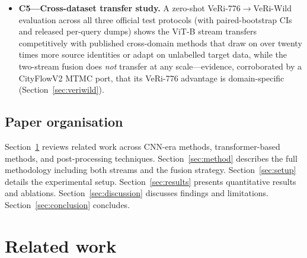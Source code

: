 \documentclass[10pt,a4paper]{article}
\begin{document}
\begin{itemize}
{    analysis.} All checkpoints (SHA-256 pinned), evaluation notebooks,
    configuration files, per-query evaluation dumps, and the post-processing
    pipeline are publicly released. Every reported number is the deterministic
    re-evaluation of a frozen, hash-pinned checkpoint and is thus
    \emph{exactly} re-computable from the release; from-scratch retraining is
    reproducible within a $\pm0.55$\,pp seed band
    (Section~\ref{sec:seed_variance}). Headline numbers use hyperparameters
    selected on the standard evaluation split---disclosed, not implicit---with
    held-out validation bounding the resulting optimism to $\leq$0.2\,pp mAP
    (Section~\ref{sec:holdout}), and the latency and memory of every pipeline
    stage---extraction, TTA, AQE, re-ranking, fusion---are measured for
    deployment planning (Section~\ref{sec:cost}).
  \item \textbf{C5---Cross-dataset transfer study.} A zero-shot
    VeRi-776$\rightarrow$VeRi-Wild evaluation across all three official test
    protocols (with paired-bootstrap CIs and released per-query dumps) shows
    the ViT-B stream transfers competitively with published cross-domain
    methods that draw on over twenty times more source identities or adapt on
    unlabelled target data, while the two-stream fusion does \emph{not}
    transfer at any scale---evidence, corroborated by a CityFlowV2 MTMC port,
    that its VeRi-776 advantage is domain-specific
    (Section~\ref{sec:veriwild}).
\end{itemize}

\subsection{Paper organisation}
Section~\ref{sec:related} reviews related work across CNN-era methods,
transformer-based methods, and post-processing techniques.
Section~\ref{sec:method} describes the full methodology including both streams
and the fusion strategy. Section~\ref{sec:setup} details the experimental
setup. Section~\ref{sec:results} presents quantitative results and ablations.
Section~\ref{sec:discussion} discusses findings and limitations.
Section~\ref{sec:conclusion} concludes.

\section{Related work}
\label{sec:related}
\end{document}
